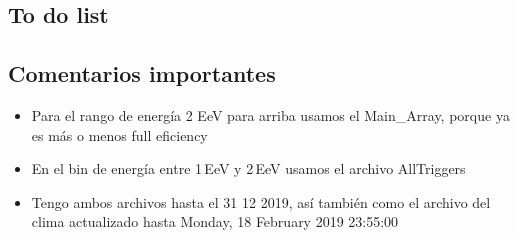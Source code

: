 \subsection*{To do list }






\subsection*{Comentarios importantes}

\begin{itemize}
  \item Para el rango de energía 2 EeV para arriba usamos el  Main\_Array, porque ya es más o menos full eficiency
  \item En el bin de energía entre 1\,EeV y 2\,EeV usamos el archivo AllTriggers
  \item Tengo ambos archivos hasta el 31 12 2019, así también como el archivo del clima actualizado hasta  Monday, 18 February 2019 23:55:00
\end{itemize}



